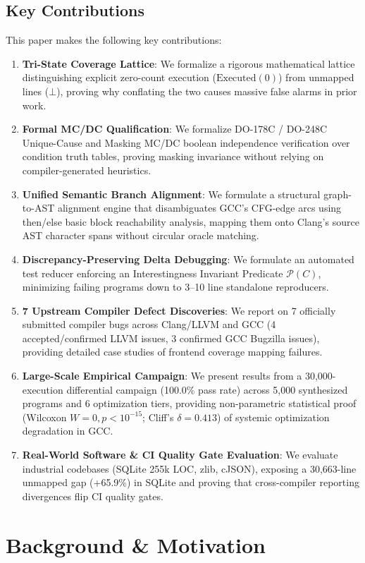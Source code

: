 \documentclass[sigconf,review,anonymous=false]{acmart}
\theoremstyle{definition}
\begin{document}
\subsection{Key Contributions}
This paper makes the following key contributions:
\begin{enumerate}
    \item \textbf{Tri-State Coverage Lattice}: We formalize a rigorous mathematical lattice distinguishing explicit zero-count execution ($\text{Executed}(0)$) from unmapped lines ($\bot$), proving why conflating the two causes massive false alarms in prior work.
    \item \textbf{Formal MC/DC Qualification}: We formalize DO-178C / DO-248C Unique-Cause and Masking MC/DC boolean independence verification over condition truth tables, proving masking invariance without relying on compiler-generated heuristics.
    \item \textbf{Unified Semantic Branch Alignment}: We formulate a structural graph-to-AST alignment engine that disambiguates GCC's CFG-edge arcs using then/else basic block reachability analysis, mapping them onto Clang's source AST character spans without circular oracle matching.
    \item \textbf{Discrepancy-Preserving Delta Debugging}: We formulate an automated test reducer enforcing an Interestingness Invariant Predicate $\mathcal{P}(C)$, minimizing failing programs down to 3--10 line standalone reproducers.
    \item \textbf{7 Upstream Compiler Defect Discoveries}: We report on 7 officially submitted compiler bugs across Clang/LLVM and GCC (4 accepted/confirmed LLVM issues, 3 confirmed GCC Bugzilla issues), providing detailed case studies of frontend coverage mapping failures.
    \item \textbf{Large-Scale Empirical Campaign}: We present results from a 30,000-execution differential campaign (100.0\% pass rate) across 5,000 synthesized programs and 6 optimization tiers, providing non-parametric statistical proof (Wilcoxon $W=0, p < 10^{-15}$; Cliff's $\delta = 0.413$) of systemic optimization degradation in GCC.
    \item \textbf{Real-World Software \& CI Quality Gate Evaluation}: We evaluate industrial codebases (SQLite 255k LOC, zlib, cJSON), exposing a 30,663-line unmapped gap (+65.9\%) in SQLite and proving that cross-compiler reporting divergences flip CI quality gates.
\end{enumerate}

\section{Background \& Motivation}
\end{document}
